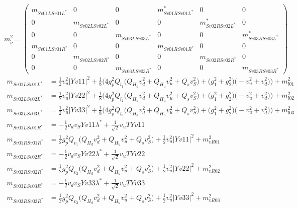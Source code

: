 \begin{itemize}
\begin{equation} 
m^2_{\tilde{\nu}} = \left( 
\begin{array}{cccccc}
m_{Sv01LSv01L^*} &0 &0 &m^*_{Sv01RSv01L^*} &0 &0\\ 
0 &m_{Sv02LSv02L^*} &0 &0 &m^*_{Sv02RSv02L^*} &0\\ 
0 &0 &m_{Sv03LSv03L^*} &0 &0 &m^*_{Sv03RSv03L^*}\\ 
m_{Sv01LSv01R^*} &0 &0 &m_{Sv01RSv01R^*} &0 &0\\ 
0 &m_{Sv02LSv02R^*} &0 &0 &m_{Sv02RSv02R^*} &0\\ 
0 &0 &m_{Sv03LSv03R^*} &0 &0 &m_{Sv03RSv03R^*}\end{array} 
\right) 
 \end{equation} 
\begin{align} 
m_{Sv01LSv01L^*} &= \frac{1}{2} v_{u}^{2} |Yv11|^2  + \frac{1}{8} \Big(4 g_{p}^{2} Q_{l_1} \Big(Q_{H_d} v_{d}^{2}  + Q_{H_u} v_{u}^{2}  + Q_s v_{S}^{2} \Big) + \Big(g_{1}^{2} + g_{2}^{2}\Big)\Big(- v_{u}^{2}  + v_{d}^{2}\Big)\Big) + m^2_{l01}\\ 
m_{Sv02LSv02L^*} &= \frac{1}{2} v_{u}^{2} |Yv22|^2  + \frac{1}{8} \Big(4 g_{p}^{2} Q_{l_2} \Big(Q_{H_d} v_{d}^{2}  + Q_{H_u} v_{u}^{2}  + Q_s v_{S}^{2} \Big) + \Big(g_{1}^{2} + g_{2}^{2}\Big)\Big(- v_{u}^{2}  + v_{d}^{2}\Big)\Big) + m^2_{l02}\\ 
m_{Sv03LSv03L^*} &= \frac{1}{2} v_{u}^{2} |Yv33|^2  + \frac{1}{8} \Big(4 g_{p}^{2} Q_{l_3} \Big(Q_{H_d} v_{d}^{2}  + Q_{H_u} v_{u}^{2}  + Q_s v_{S}^{2} \Big) + \Big(g_{1}^{2} + g_{2}^{2}\Big)\Big(- v_{u}^{2}  + v_{d}^{2}\Big)\Big) + m^2_{l03}\\ 
m_{Sv01LSv01R^*} &= -\frac{1}{2} v_d v_S Yv11 \lambda^*  + \frac{1}{\sqrt{2}} v_u TYv11 \\ 
m_{Sv01RSv01R^*} &= \frac{1}{2} g_{p}^{2} Q_{v_1} \Big(Q_{H_d} v_{d}^{2}  + Q_{H_u} v_{u}^{2}  + Q_s v_{S}^{2} \Big) + \frac{1}{2} v_{u}^{2} |Yv11|^2  + m^2_{vR01}\\ 
m_{Sv02LSv02R^*} &= -\frac{1}{2} v_d v_S Yv22 \lambda^*  + \frac{1}{\sqrt{2}} v_u TYv22 \\ 
m_{Sv02RSv02R^*} &= \frac{1}{2} g_{p}^{2} Q_{v_2} \Big(Q_{H_d} v_{d}^{2}  + Q_{H_u} v_{u}^{2}  + Q_s v_{S}^{2} \Big) + \frac{1}{2} v_{u}^{2} |Yv22|^2  + m^2_{vR02}\\ 
m_{Sv03LSv03R^*} &= -\frac{1}{2} v_d v_S Yv33 \lambda^*  + \frac{1}{\sqrt{2}} v_u TYv33 \\ 
m_{Sv03RSv03R^*} &= \frac{1}{2} g_{p}^{2} Q_{v_3} \Big(Q_{H_d} v_{d}^{2}  + Q_{H_u} v_{u}^{2}  + Q_s v_{S}^{2} \Big) + \frac{1}{2} v_{u}^{2} |Yv33|^2  + m^2_{vR03}

\end{align}
\end{itemize}
